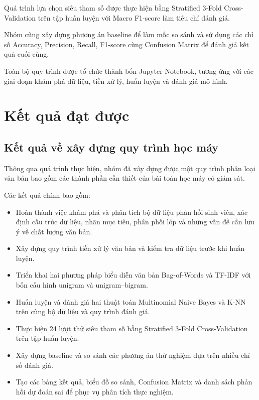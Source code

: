 Quá trình lựa chọn siêu tham số được thực
hiện bằng Stratified 3-Fold Cross-Validation
trên tập huấn luyện với Macro F1-score
làm tiêu chí đánh giá.

Nhóm cũng xây dựng phương án baseline
để làm mốc so sánh và sử dụng các chỉ số
Accuracy, Precision, Recall, F1-score
cùng Confusion Matrix để đánh giá
kết quả cuối cùng.

Toàn bộ quy trình được tổ chức thành bốn
Jupyter Notebook, tương ứng với các giai
đoạn khám phá dữ liệu, tiền xử lý, huấn luyện
và đánh giá mô hình.



\section{Kết quả đạt được}

\subsection{Kết quả về xây dựng quy trình học máy}

Thông qua quá trình thực hiện, nhóm đã xây dựng
được một quy trình phân loại văn bản bao gồm
các thành phần cần thiết của bài toán học máy
có giám sát.

Các kết quả chính bao gồm:

\begin{itemize}

    \item Hoàn thành việc khám phá và phân tích
    bộ dữ liệu phản hồi sinh viên, xác định
    cấu trúc dữ liệu, nhãn mục tiêu, phân phối
    lớp và những vấn đề cần lưu ý về chất
    lượng văn bản.

    \item Xây dựng quy trình tiền xử lý văn bản
    và kiểm tra dữ liệu trước khi huấn luyện.

    \item Triển khai hai phương pháp biểu diễn
    văn bản Bag-of-Words và TF-IDF với bốn
    cấu hình unigram và unigram--bigram.

    \item Huấn luyện và đánh giá hai thuật toán
    Multinomial Naive Bayes và K-NN trên cùng
    bộ dữ liệu và quy trình đánh giá.

    \item Thực hiện 24 lượt thử siêu tham số
    bằng Stratified 3-Fold Cross-Validation
    trên tập huấn luyện.

    \item Xây dựng baseline và so sánh các
    phương án thử nghiệm dựa trên nhiều
    chỉ số đánh giá.

    \item Tạo các bảng kết quả, biểu đồ
    so sánh, Confusion Matrix và danh sách
    phản hồi dự đoán sai để phục vụ
    phân tích thực nghiệm.

\end{itemize}

